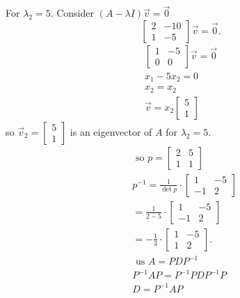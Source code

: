 \documentclass[11pt]{article}
\begin{document}
\begin{enumerate}[{\bf Q1.}]
\begin{enumerate}
			For $\lambda_2=5$. \newline
			Consider $(A-\lambda I) \vec{v}=\overrightarrow{0}$
			$$
			\left[\begin{array}{cc}
			2 & -10 \\
			1 & -5
			\end{array}\right] \vec{v}=\overrightarrow{0} .
			$$
			$$
			\begin{gathered}
			{\left[\begin{array}{cc}
			1 & -5 \\
			0 & 0
			\end{array}\right] \vec{v}=\overrightarrow{0}} \\
			x_1-5 x_2=0 \\
			x_2=x_2 \\
			\vec{v}=x_2\left[\begin{array}{l}
			5 \\
			1
			\end{array}\right]
			\end{gathered}
			$$
			so $\vec{v}_2=\left[\begin{array}{l}5 \\ 1\end{array}\right]$ is an eigenvector of $A$ for $\lambda_2=5$.
			$$
			\begin{aligned}
			& \text { so } p=\left[\begin{array}{ll}
			2 & 5 \\
			1 & 1
			\end{array}\right] \\
			& p^{-1}=\frac{1}{\operatorname{det} p} \cdot\left[\begin{array}{cc}
			1 & -5 \\
			-1 & 2
			\end{array}\right] \\
			& =\frac{1}{2-5} \cdot\left[\begin{array}{cc}
			1 & -5 \\
			-1 & 2
			\end{array}\right] \\
			& =-\frac{1}{3} \cdot\left[\begin{array}{cc}
			1 & -5 \\
			1 & 2
			\end{array}\right] \text {. } \\
			& \text { us } A=P D P^{-1} \\
			& P^{-1} A P=P^{-1} P D P^{-1} P \\
			& D=P^{-1} A P \\

\end{aligned}$$
\end{enumerate}
\end{enumerate}
\end{document}
